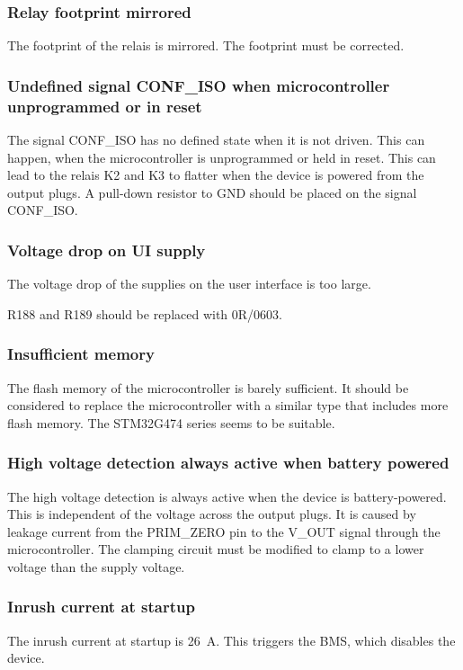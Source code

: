 \subsubsection{Relay footprint mirrored}
The footprint of the relais is mirrored. The footprint must be corrected. 

\subsubsection{Undefined signal CONF\_ISO when microcontroller unprogrammed or in reset}
The signal CONF\_ISO has no defined state when it is not driven. This can happen, when the microcontroller is unprogrammed or held in reset. This can lead to the relais K2 and K3 to flatter when the device is powered from the output plugs. 
A pull-down resistor to GND should be placed on the signal CONF\_ISO. 

\subsubsection{Voltage drop on UI supply}
The voltage drop of the supplies on the user interface is too large. 

R188 and R189 should be replaced with 0R/0603. 

\subsubsection{Insufficient memory}
The flash memory of the microcontroller is barely sufficient. It should be considered to replace the microcontroller with a similar type that includes more flash memory. The STM32G474 series seems to be suitable. 

\subsubsection{High voltage detection always active when battery powered}
The high voltage detection is always active when the device is battery-powered. This is independent of the voltage across the output plugs. It is caused by leakage current from the PRIM\_ZERO pin to the V\_OUT signal through the microcontroller. 
The clamping circuit must be modified to clamp to a lower voltage than the supply voltage. 

\subsubsection{Inrush current at startup}
The inrush current at startup is \qty{26}{\ampere}. This triggers the BMS, which disables the device. 

